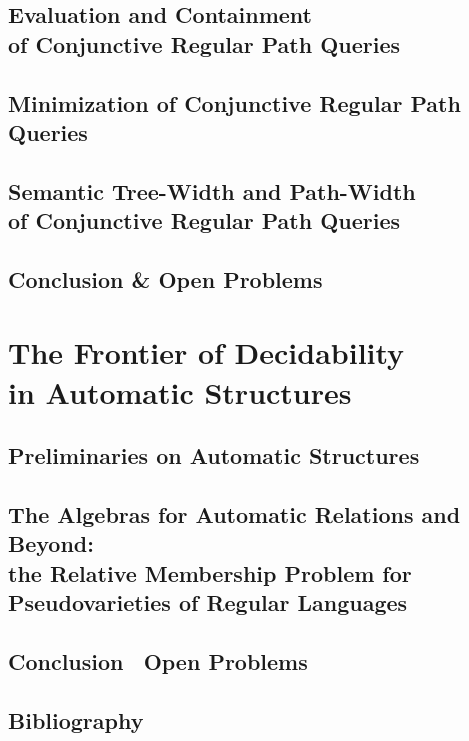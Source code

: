 \documentclass[a4paper,sfsidenotes,twoside,justified,nobib]{tufte-book-custom}
\begin{document}
\lipsum[3-10]

\chapter[Evaluation and Containment of Conjunctive Regular Path Queries]{Evaluation and Containment\\ of Conjunctive Regular Path Queries}

\chapter{Minimization of Conjunctive Regular Path Queries}

\chapter[{Semantic Tree-Width and Path-Width of Conjunctive Regular Path Queries}]{Semantic Tree-Width and Path-Width\\of Conjunctive Regular Path Queries}


\chapter{Conclusion \& Open Problems}

\part[The Frontier of Decidability in Automatic Structures]{The Frontier of Decidability\\in Automatic Structures}

\chapter{Preliminaries on Automatic Structures}



\chapter{The Algebras for Automatic Relations and Beyond:\\the Relative Membership Problem for Pseudovarieties of Regular Languages}

\chapter{Conclusion \fancyand~Open Problems}


\backmatter
\begin{fullwidth}
	\chapter*{Bibliography}
	\setlength{\columnsep}{8mm}
	\begin{multicols}{2}
		\printbibliography[heading=none]
	\end{multicols}
\end{fullwidth}
\end{document}
